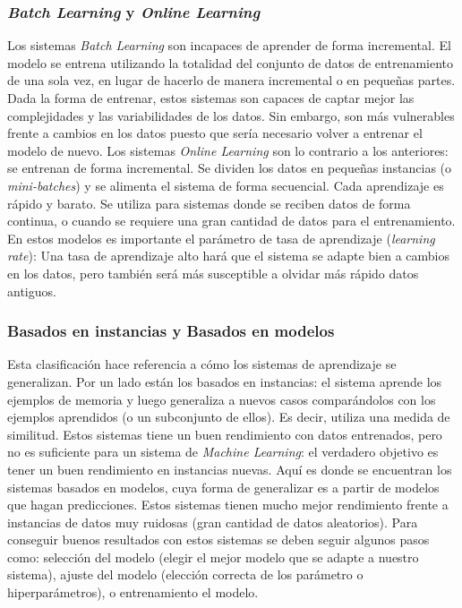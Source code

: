 \documentclass[12pt,a4paper,Spanish]{article}
\begin{document}
\subsubsection{\textit{Batch Learning} y \textit{Online Learning}}
Los sistemas \textit{Batch Learning} son incapaces de aprender de forma incremental. El modelo se entrena utilizando la totalidad del conjunto de datos de entrenamiento de una sola vez, en lugar de hacerlo de manera incremental o en pequeñas partes. Dada la forma de entrenar, estos sistemas son capaces de captar mejor las complejidades y las variabilidades de los datos. Sin embargo, son más vulnerables frente a cambios en los datos puesto que sería necesario volver a entrenar el modelo de nuevo.
\newline
Los sistemas \textit{Online Learning} son lo contrario a los anteriores: se entrenan de forma incremental. Se dividen los datos en pequeñas instancias (o \textit{mini-batches}) y se alimenta el sistema de forma secuencial. Cada aprendizaje es rápido y barato. Se utiliza para sistemas donde se reciben datos de forma continua, o cuando se requiere una gran cantidad de datos para el entrenamiento. En estos modelos es importante el parámetro de tasa de aprendizaje (\textit{learning rate}): Una tasa de aprendizaje alto hará que el sistema se adapte bien a cambios en los datos, pero también será más susceptible a olvidar más rápido datos antiguos.


\subsubsection{Basados en instancias y Basados en modelos}
Esta clasificación hace referencia a cómo los sistemas de aprendizaje se generalizan. Por un lado están los basados en instancias: el sistema aprende los ejemplos de memoria y luego generaliza a nuevos casos comparándolos con los ejemplos aprendidos (o un subconjunto de
ellos). Es decir, utiliza una medida de similitud. Estos sistemas tiene un buen rendimiento con datos entrenados, pero no es suficiente para un sistema de \textit{Machine Learning}: el verdadero objetivo es tener un buen rendimiento en instancias nuevas.
\newline
Aquí es donde se encuentran los sistemas basados en modelos, cuya forma de generalizar es a partir de modelos que hagan predicciones. Estos sistemas tienen mucho mejor rendimiento frente a instancias de datos muy ruidosas (gran cantidad de datos aleatorios). Para conseguir buenos resultados con estos sistemas se deben seguir algunos pasos como: selección del modelo (elegir el mejor modelo que se adapte a nuestro sistema), ajuste del modelo (elección correcta de los parámetro o hiperparámetros),  o entrenamiento el modelo.
\end{document}
